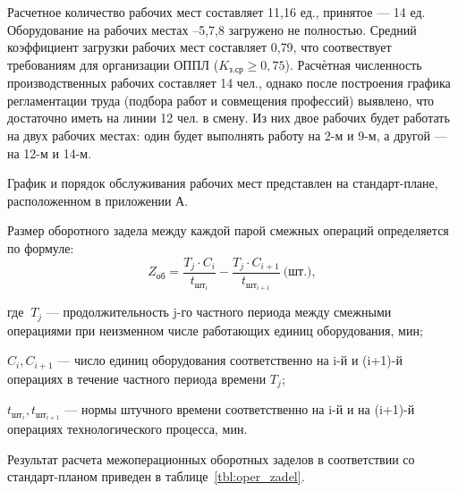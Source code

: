 Расчетное количество рабочих мест составляет 11{,}16 ед.,
принятое --- 14 ед.
Оборудование на рабочих местах \textnumero {}--5,7,8 
загружено не полностью.
Средний коэффициент загрузки рабочих мест составляет 0{,}79, что соотвествует
требованиям для организации ОППЛ (\( K_{\text{з.ср}} \ge 0{,}75 \)).
Расчѐтная численность производственных рабочих составляет 14 чел.,
однако после построения графика регламентации труда
(подбора работ и совмещения профессий) выявлено, что достаточно
иметь на линии 12 чел. в смену.
Из них двое рабочих будет работать на двух рабочих местах:
один будет выполнять работу на 2-м и 9-м, а другой --- на 12-м и 14-м.

График и порядок обслуживания рабочих мест представлен на стандарт-плане,
расположенном в приложении А.

Размер оборотного задела между каждой парой смежных операций определяется 
по формуле:
\begin{equation*}
  Z_{\text{об}} = 
  \dfrac{T_j \cdot C_i}{t_{\text{шт}_i}} - \dfrac{T_j \cdot C_{i+1}}{t_{\text{шт}_{i+1}}} 
  \: \text{(шт.)},
\end{equation*}

\noindent где \( \: T_j \) --- продолжительность j-го частного периода между
смежными операциями при неизменном числе работающих единиц оборудования, мин;

\( C_i, C_{i+1} \) --- число единиц оборудования соответственно на i-й и 
(i+1)-й операциях в течение частного периода времени \( T_j \);

\( t_{\text{шт}_i}, t_{\text{шт}_{i+1}}\) --- нормы штучного времени соответственно на
i-й и на (i+1)-й операциях технологического процесса, мин.

Результат расчета межоперационных оборотных заделов в соответствии со 
стандарт-планом приведен в таблице~\ref{tbl:oper_zadel}.

